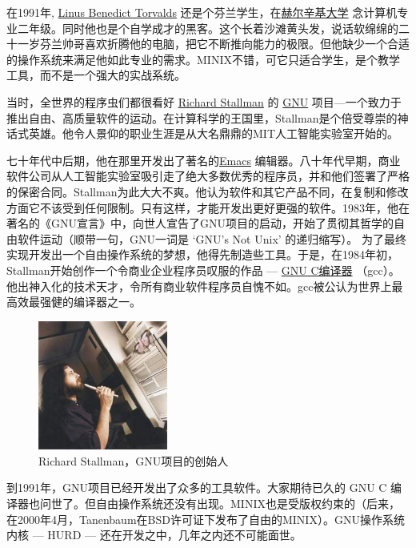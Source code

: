 \documentclass[12pt,a4paper]{article}
\begin{document}
  在1991年, \href{http://www.cs.helsinki.fi/~torvalds/}{Linus Benedict Torvalds} 还是个芬兰学生，在\href{http://www.hut.fi}{赫尔辛基大学} 念计算机专业二年级。同时他也是个自学成才的黑客。这个长着沙滩黄头发，说话软绵绵的二十一岁芬兰帅哥喜欢折腾他的电脑，把它不断推向能力的极限。但他缺少一个合适的操作系统来满足他如此专业的需求。MINIX不错，可它只适合学生，是个教学工具，而不是一个强大的实战系统。

  当时，全世界的程序虫们都很看好 \href{http://www.stallman.org/}{Richard Stallman} 的 \href{http://www.gnu.org/}{GNU} 项目---一个致力于推出自由、高质量软件的运动。在计算科学的王国里，Stallman是个倍受尊崇的神话式英雄。他令人景仰的职业生涯是从大名鼎鼎的MIT人工智能实验室开始的。

  七十年代中后期，他在那里开发出了著名的\href{http://en.wikipedia.org/wiki/Emacs}{Emacs} 编辑器。八十年代早期，商业软件公司从人工智能实验室吸引走了绝大多数优秀的程序员，并和他们签署了严格的保密合同。Stallman为此大大不爽。他认为软件和其它产品不同，在复制和修改方面它不该受到任何限制。只有这样，才能开发出更好更强的软件。1983年，他在著名的《GNU宣言》中，向世人宣告了GNU项目的启动，开始了贯彻其哲学的自由软件运动（顺带一句，GNU一词是 ‘GNU's Not Unix’ 的递归缩写）。 为了最终实现开发出一个自由操作系统的梦想，他得先制造些工具。于是，在1984年初，Stallman开始创作一个令商业企业程序员叹服的作品 --- \href{http://en.wikipedia.org/wiki/GNU_Compiler_Collection}{GNU C编译器} （gcc）。他出神入化的技术天才，令所有商业软件程序员自愧不如。gcc被公认为世界上最高效最强健的编译器之一。

  \begin{figure}[h!]
  \centering
  \includegraphics[width=0.38\textwidth]{./figs/stallman.png}
  \caption{Richard Stallman，GNU项目的创始人}
  \end{figure}

  到1991年，GNU项目已经开发出了众多的工具软件。大家期待已久的 GNU C 编译器也问世了。但自由操作系统还没有出现。MINIX也是受版权约束的（后来，在2000年4月，Tanenbaum在BSD许可证下发布了自由的MINIX）。GNU操作系统内核 --- HURD --- 还在开发之中，几年之内还不可能面世。
\end{document}
